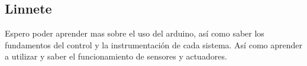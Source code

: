 \subsection{Linnete}
Espero poder aprender mas sobre el uso del arduino, así como saber los fundamentos del control y la instrumentación de cada sistema. Así como aprender a utilizar y saber el funcionamiento de sensores y actuadores.